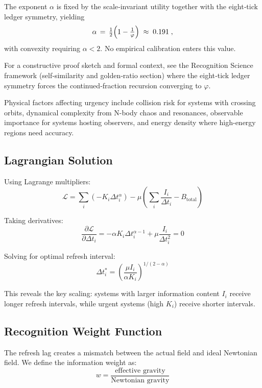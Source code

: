 \documentclass[twocolumn,prd,amsmath,amssymb,aps,superscriptaddress,nofootinbib]{revtex4-2}
\begin{document}
The exponent $\alpha$ is fixed by the scale‑invariant utility together with the eight‑tick ledger symmetry, yielding
\[
  \alpha \,=\, \tfrac12\Bigl(1 - \tfrac{1}{\varphi}\Bigr)\;\approx\;0.191\;,
\]
with convexity requiring $\alpha<2$. No empirical calibration enters this value.

For a constructive proof sketch and formal context, see the Recognition Science framework (self‑similarity and golden‑ratio section) where the eight‑tick ledger symmetry forces the continued‑fraction recursion converging to $\varphi$.

Physical factors affecting urgency include collision risk for systems with crossing orbits, dynamical complexity from N-body chaos and resonances, observable importance for systems hosting observers, and energy density where high-energy regions need accuracy.

\subsection{Lagrangian Solution}

Using Lagrange multipliers:
\begin{equation}
\mathcal{L} = \sum_i (-K_i \Delta t_i^\alpha) - \mu\left(\sum_i \frac{I_i}{\Delta t_i} - B_{\text{total}}\right)
\end{equation}

Taking derivatives:
\begin{equation}
\frac{\partial \mathcal{L}}{\partial \Delta t_i} = -\alpha K_i \Delta t_i^{\alpha-1} + \mu \frac{I_i}{\Delta t_i^2} = 0
\end{equation}

Solving for optimal refresh interval:
\begin{equation}
\Delta t_i^* = \left(\frac{\mu I_i}{\alpha K_i}\right)^{1/(2-\alpha)}
\end{equation}

This reveals the key scaling: systems with larger information content $I_i$ receive longer refresh intervals, while urgent systems (high $K_i$) receive shorter intervals.

\subsection{Recognition Weight Function}

The refresh lag creates a mismatch between the actual field and ideal Newtonian field. We define the information weight as:
\begin{equation}
w = \frac{\text{effective gravity}}{\text{Newtonian gravity}}
\end{equation}
\end{document}
